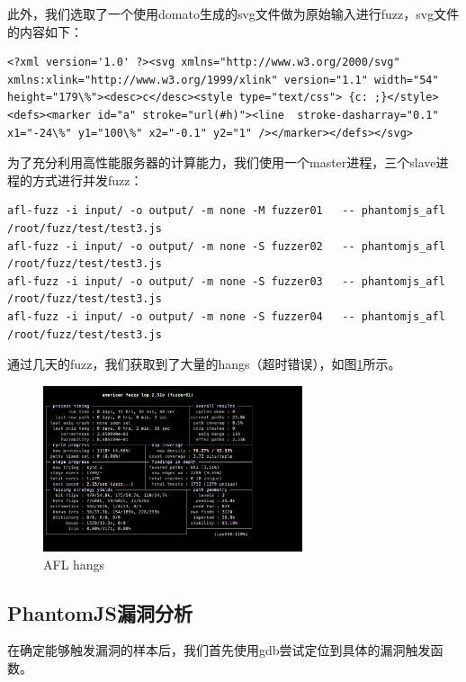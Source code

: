 \documentclass[doctor,privacy,twoside]{buaa_mac}
\begin{document}
此外，我们选取了一个使用domato生成的svg文件做为原始输入进行fuzz，svg文件的内容如下：
\lstset{language=JavaScript}
\begin{lstlisting}
<?xml version='1.0' ?><svg xmlns="http://www.w3.org/2000/svg" xmlns:xlink="http://www.w3.org/1999/xlink" version="1.1" width="54" height="179\%"><desc>c</desc><style type="text/css"> {c: ;}</style><defs><marker id="a" stroke="url(#h)"><line  stroke-dasharray="0.1" x1="-24\%" y1="100\%" x2="-0.1" y2="1" /></marker></defs></svg>
\end{lstlisting}

为了充分利用高性能服务器的计算能力，我们使用一个master进程，三个slave进程的方式进行并发fuzz：

\lstset{language=JavaScript}
\begin{lstlisting}
afl-fuzz -i input/ -o output/ -m none -M fuzzer01   -- phantomjs_afl /root/fuzz/test/test3.js
afl-fuzz -i input/ -o output/ -m none -S fuzzer02   -- phantomjs_afl /root/fuzz/test/test3.js
afl-fuzz -i input/ -o output/ -m none -S fuzzer03   -- phantomjs_afl /root/fuzz/test/test3.js
afl-fuzz -i input/ -o output/ -m none -S fuzzer04   -- phantomjs_afl /root/fuzz/test/test3.js
\end{lstlisting}

通过几天的fuzz，我们获取到了大量的hangs（超时错误），如图\ref{fig:hangs}所示。

\centerline{}
\begin{figure}[!h]
  \centering
  \includegraphics[width=0.68\textwidth]{images/afl_hangs.png}
  \caption{AFL hangs}
  \label{fig:hangs}
\end{figure}
\centerline{}


\subsection{PhantomJS漏洞分析}

在确定能够触发漏洞的样本后，我们首先使用gdb尝试定位到具体的漏洞触发函数。
\end{document}
